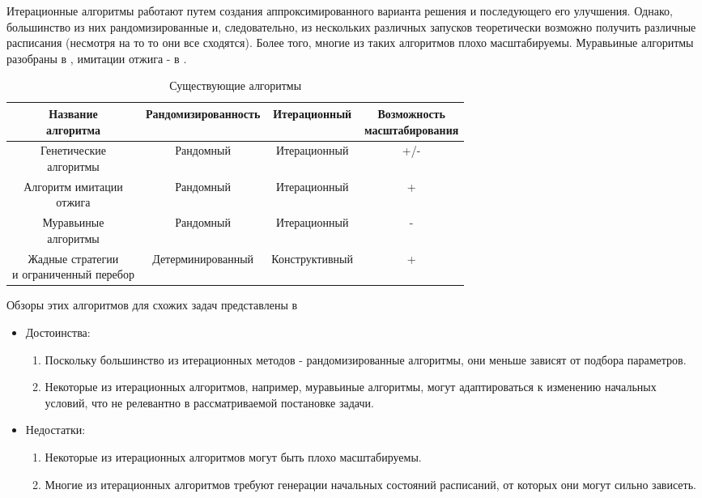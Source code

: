 Итерационные алгоритмы работают путем создания аппроксимированного варианта решения и последующего его улучшения. Однако, большинство из них рандомизированные и, следовательно, из нескольких различных запусков теоретически возможно получить различные расписания (несмотря на то то они все сходятся). Более того, многие из таких алгоритмов плохо масштабируемы. Муравьиные алгоритмы разобраны в \cite{Shtovba_2005}, имитации отжига - в \cite{Kirkpatrick_1983}.
\begin{table}[H]
    \caption{Существующие алгоритмы}
    \begin{tabular}{ c | c | c | c  }
        \makecell{Название          \\алгоритма} & Рандомизированность & Итерационный & \makecell{Возможность \\ масштабирования} \\
        \hline
        \makecell{Генетические      \\алгоритмы} & Рандомный & Итерационный & +/- \\
        \makecell{Алгоритм имитации \\отжига} & Рандомный & Итерационный & + \\
        \makecell{Муравьиные        \\алгоритмы} & Рандомный & Итерационный & - \\
        \makecell{Жадные стратегии  \\и ограниченный перебор} & Детерминированный & Конструктивный & + \\
    \end{tabular}

\end{table}

Обзоры этих алгоритмов для схожих задач представлены в \cite{Coffman,Davis_2011,Shakhbazyan_1981}

\begin{itemize}
    \item Достоинства:
          \begin{enumerate}
              \item Поскольку большинство из итерационных методов - рандомизированные алгоритмы, они меньше зависят от подбора параметров.
              \item Некоторые из итерационных алгоритмов, например, муравьиные алгоритмы, могут адаптироваться к изменению начальных условий, что не релевантно в рассматриваемой постановке задачи.
          \end{enumerate}
    \item Недостатки:
          \begin{enumerate}
              \item Некоторые из итерационных алгоритмов могут быть плохо масштабируемы. 
              \item Многие из итерационных алгоритмов требуют генерации начальных состояний расписаний, от которых они могут сильно зависеть.
          \end{enumerate}
\end{itemize}